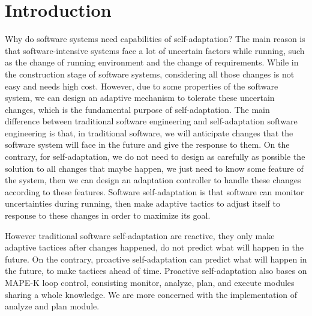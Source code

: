 \documentclass[sigconf]{acmart}
\begin{document}


\maketitle

\section{Introduction}
Why do software systems need  capabilities of self-adaptation?
The main reason is that software-intensive systems face a lot of uncertain factors while running, such as the change of running environment and the change of requirements. While in the construction stage of software systems, considering all those changes is not easy and needs high cost. However, due to some properties of the software system, we can design an adaptive mechanism to tolerate these uncertain changes, which is the fundamental purpose of self-adaptation. The main difference between traditional software engineering and self-adaptation software engineering is that, in traditional software, we will anticipate changes that the software system will face in the future and give the response to them. On the contrary, for self-adaptation, we do not need to design as carefully as possible the solution to all changes that maybe happen, we just need to know some feature of the system, then we can design an adaptation controller to handle these changes according to these features.
Software self-adaptation is that software can monitor uncertainties during running, then make adaptive tactics to adjust itself to response to these changes in order to maximize its goal.

However traditional software self-adaptation are reactive, they only make adaptive tactices after changes happened, do not predict what will happen in the future. On the contrary, proactive self-adaptation can predict what will happen in the future, to make tactices ahead of time. Proactive self-adaptation also bases on MAPE-K loop control\cite{mape}, consisting monitor, analyze, plan, and execute modules sharing a whole knowledge. We are more concerned with the implementation of analyze and plan module.
\end{document}

